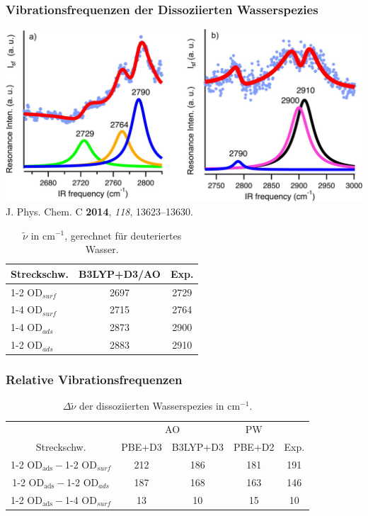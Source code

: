 \documentclass[hyperref={pdfpagelabels=false}]{beamer}
\begin{document}
\begin{frame}
 \frametitle{Vibrationsfrequenzen der Dissoziierten Wasserspezies}
  \centering
  \includegraphics[width=.7\textwidth]{figures/0001_OD_vib_exp.jpeg}\\
  \footnotesize{J. Phys. Chem. C \textbf{2014}, \textit{118}, 13623--13630.}
  \begin{table}[!h]
  \centering
  \caption{$\tilde{\nu}$ in cm$^{-1}$, gerechnet für deuteriertes Wasser.}
  \begin{tabular}{l|cc}
  \toprule
 Streckschw. &B3LYP+D3/AO & Exp.\\\midrule
 1-2 OD$_{surf}$&2697&2729\\
 1-4 OD$_{surf}$&2715&2764\\
 1-4 OD$_{ads}$&2873&2900\\
 1-2 OD$_{ads}$&2883&2910\\\bottomrule
  \end{tabular}
 \end{table}
 \end{frame}
 \begin{frame}
 \frametitle{Relative Vibrationsfrequenzen}
  \begin{table}[!h]
  \centering
    \caption{$\Delta \tilde{\nu}$ der dissoziierten Wasserspezies in cm$^{-1}$.}
    \vspace{-0.5cm}
  \begin{tabular}{c|cc|c|c}
  \toprule
& \multicolumn{2}{c}{AO} & PW & \\
 Streckschw. &PBE+D3 & B3LYP+D3 & PBE+D2 & Exp.\\\midrule
 1-2 OD$_{\textrm{ads}}-$1-2 OD$_{surf}$& 212& 186& 181& 191 \\
 1-2 OD$_{\textrm{ads}}-$1-2 OD$_{ads}$ & 187& 168& 163& 146\\
 1-2 OD$_{\textrm{ads}}-$1-4 OD$_{surf}$& 13& 10& 15& 10\\\bottomrule
  \end{tabular}
 \end{table}
\end{frame} 
\end{document}
